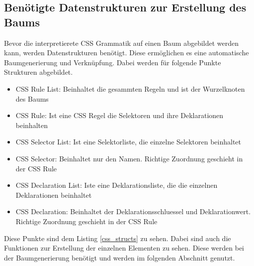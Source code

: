 \subsection{Benötigte Datenstrukturen zur Erstellung des Baums}
Bevor die interpretierete CSS Grammatik auf einen Baum abgebildet werden kann, werden Datenstrukturen benötigt. Diese ermöglichen es eine automatische Baumgenerierung und Verknüpfung. Dabei werden für folgende Punkte Strukturen abgebildet.
\begin{itemize}
\item{CSS Rule List: Beinhaltet die gesammten Regeln und ist der Wurzelknoten des Baums} 
\item{CSS Rule: Ist eine CSS Regel die Selektoren und ihre Deklarationen beinhalten} 
\item{CSS Selector List: Ist eine Selektorliste, die einzelne Selektoren beinhaltet} 
\item{CSS Selector: Beinhaltet nur den Namen. Richtige Zuordnung geschieht in der CSS Rule} 
\item{CSS Declaration List: Iste eine Deklarationsliste, die die einzelnen Deklarationen beinhaltet} 
\item{CSS Declaration: Beinhaltet der Deklarationsschluessel und Deklarationwert. Richtige Zuordnung geschieht in der CSS Rule} 
\end{itemize}
Diese Punkte sind dem Listing \ref{css_structs} zu sehen. Dabei sind auch die Funktionen zur Erstellung der einzelnen Elementen zu sehen. Diese werden bei der Baumgenerierung benötigt und werden im folgenden Abschnitt genutzt.
